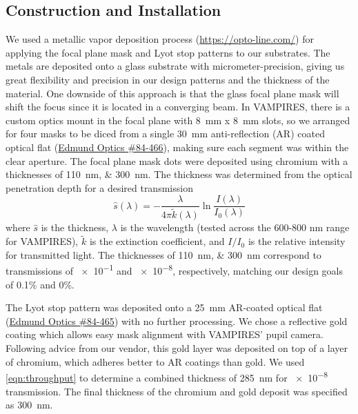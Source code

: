 \documentclass[]{spie}  %
\begin{document}
\subsection{Construction and Installation}\label{sec:install}

We used a metallic vapor deposition process (\url{https://opto-line.com/}) for applying the focal plane mask and Lyot stop patterns to our substrates. The metals are deposited onto a glass substrate with micrometer-precision, giving us great flexibility and precision in our design patterns and the thickness of the material. One downside of this approach is that the glass focal plane mask will shift the focus since it is located in a converging beam. In VAMPIRES, there is a custom optics mount in the focal plane with \qty{8}{\milli\meter} x \qty{8}{\milli\meter} slots, so we arranged for four masks to be diced from a single \qty{30}{\milli\meter} anti-reflection (AR) coated optical flat (\href{https://www.edmundoptics.com/p/30mm-dia-4mm-thick-nir-i-coated-lambda10-fused-silica-window/27562/}{Edmund Optics \#84-466}), making sure each segment was within the clear aperture. The focal plane mask dots were deposited using chromium with a thicknesses of \qtylist{110;300}{\nano\meter}. The thickness was determined from the optical penetration depth for a desired transmission
\begin{equation}
    \hat{s}(\lambda) = -\frac{\lambda}{4\pi\tilde{k}(\lambda)}\ln{\frac{I(\lambda)}{I_0(\lambda)}}
    \label{eqn:throughput}
\end{equation}
where $\hat{s}$ is the thickness, $\lambda$ is the wavelength (tested across the 600-800 nm range for VAMPIRES), $\tilde{k}$ is the extinction coefficient, and $I/I_0$ is the relative intensity for transmitted light. The thicknesses of \qtylist{110;300}{\nano\meter} correspond to transmissions of \num{e-1} and \num{e-8}, respectively, matching our design goals of 0.1\% and 0\%.

The Lyot stop pattern was deposited onto a \qty{25}{\milli\meter} AR-coated optical flat (\href{https://www.edmundoptics.com/p/25mm-dia-3mm-thick-nir-i-coated-lambda10-fused-silica-window/27561/}{Edmund Optics \#84-465}) with no further processing. We chose a reflective gold coating which allows easy mask alignment with VAMPIRES' pupil camera. Following advice from our vendor, this gold layer was deposited on top of a layer of chromium, which adheres better to AR coatings than gold. We used \autoref{eqn:throughput} to determine a combined thickness of \qty{285}{\nano\meter} for \num{e-8} transmission. The final thickness of the chromium and gold deposit was specified as \qty{300}{\nano\meter}.
\end{document}
